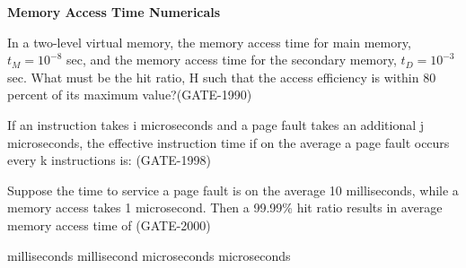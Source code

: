 \centerline{\textbf{ \LARGE Memory Access Time Numericals}}

\setcounter{question}{0}



\begin{questyle}

  \question  In a two-level virtual memory, the memory access time for main memory,   {\large \(  t_{M}=10^{-8}  \) }  sec, and the memory access time for
            the secondary memory,  {\large \( t_D=10^{-3} \) }  sec. What must be the hit ratio, H such that the access efficiency is within 80 percent
            of its maximum value?(GATE-1990)

\end{questyle}


\begin{questyle}

  \question  If an instruction takes i microseconds and a page fault takes an additional j microseconds, the effective
              instruction time if on the average a  page fault occurs every k instructions is: (GATE-1998)

  \begin{choices}
  \end{choices}

\end{questyle}


\begin{questyle}

  \question  Suppose the time to service a page fault is on the average 10 milliseconds, while a memory access takes 1 microsecond.
             Then a 99.99\% hit ratio results in average memory access time of (GATE-2000)

  \begin{choices}
     milliseconds
     millisecond
     microseconds
     microseconds
  \end{choices}

\end{questyle}

